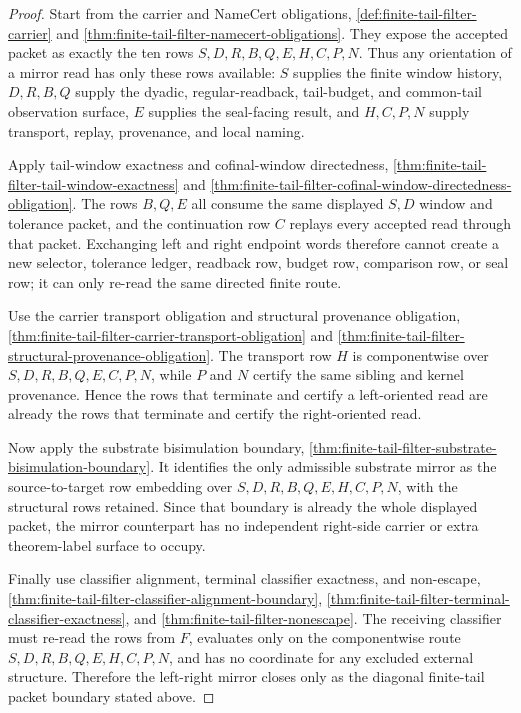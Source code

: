 \begin{proof}
Start from the carrier and NameCert obligations, \autoref{def:finite-tail-filter-carrier} and \autoref{thm:finite-tail-filter-namecert-obligations}. They expose the accepted packet as exactly the ten rows $S,D,R,B,Q,E,H,C,P,N$. Thus any orientation of a mirror read has only these rows available: $S$ supplies the finite window history, $D,R,B,Q$ supply the dyadic, regular-readback, tail-budget, and common-tail observation surface, $E$ supplies the seal-facing result, and $H,C,P,N$ supply transport, replay, provenance, and local naming.

Apply tail-window exactness and cofinal-window directedness, \autoref{thm:finite-tail-filter-tail-window-exactness} and \autoref{thm:finite-tail-filter-cofinal-window-directedness-obligation}. The rows $B,Q,E$ all consume the same displayed $S,D$ window and tolerance packet, and the continuation row $C$ replays every accepted read through that packet. Exchanging left and right endpoint words therefore cannot create a new selector, tolerance ledger, readback row, budget row, comparison row, or seal row; it can only re-read the same directed finite route.

Use the carrier transport obligation and structural provenance obligation, \autoref{thm:finite-tail-filter-carrier-transport-obligation} and \autoref{thm:finite-tail-filter-structural-provenance-obligation}. The transport row $H$ is componentwise over $S,D,R,B,Q,E,C,P,N$, while $P$ and $N$ certify the same sibling and kernel provenance. Hence the rows that terminate and certify a left-oriented read are already the rows that terminate and certify the right-oriented read.

Now apply the substrate bisimulation boundary, \autoref{thm:finite-tail-filter-substrate-bisimulation-boundary}. It identifies the only admissible substrate mirror as the source-to-target row embedding over $S,D,R,B,Q,E,H,C,P,N$, with the structural rows retained. Since that boundary is already the whole displayed packet, the mirror counterpart has no independent right-side carrier or extra theorem-label surface to occupy.

Finally use classifier alignment, terminal classifier exactness, and non-escape, \autoref{thm:finite-tail-filter-classifier-alignment-boundary}, \autoref{thm:finite-tail-filter-terminal-classifier-exactness}, and \autoref{thm:finite-tail-filter-nonescape}. The receiving classifier must re-read the rows from $F$, evaluates only on the componentwise route $S,D,R,B,Q,E,H,C,P,N$, and has no coordinate for any excluded external structure. Therefore the left-right mirror closes only as the diagonal finite-tail packet boundary stated above.
\end{proof}

